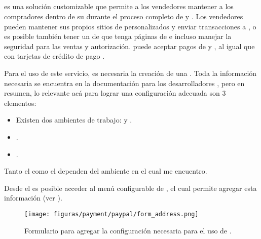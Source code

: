 		\subsection*{\PPPaymentProNAME}
			\PPPaymentProNAME es una solución customizable que permite a los vendedores mantener a los compradores dentro de su \websiteINT durante el proceso completo de \paymentsCOM y \checkoutCOM. Los vendedores pueden mantener sus propios sitios de \checkoutCOM personalizados y enviar transacciones a \paypalNAME, o es posible también tener un \hostCPT de \paypalNAME que tenga páginas de \checkoutCOM e incluso manejar la seguridad para las ventas y autorización. \PPPaymentProNAME puede aceptar pagos de \paypalNAME y  \paypalCreditNAME, al igual que con tarjetas de crédito de pago \cite{online_paypal_developer_acceptpayments}.

			Para el uso de este servicio, es necesaria la creación de una \paypalNAME \appINT. Toda la información necesaria se encuentra en la documentación para los desarrolladores \cite{online_paypal_developer_apps_credentials}, pero en resumen, lo relevante acá para lograr una configuración adecuada son 3 elementos:

				\begin{itemize}
					\item Existen dos ambientes de trabajo: \sandboxEnvPL y \liveEnvPL.
					\item \clientIDPayPal.
					\item \secretPayPal.
				\end{itemize}

			Tanto el \clientIDPayPal como el \secretPayPal dependen del ambiente en el cual me encuentro.

			Desde el \dashboardEF es posible acceder al menú configurable de \paypalNAME, el cual permite agregar esta información (ver ).

			\begin{figure}[H]
				\centering
				\texttt{[image: figuras/payment/paypal/form\_address.png]}
				\caption{Formulario para agregar la configuración necesaria para el uso de \paypalPayFlowNAME.}
				\label{figure:payment:paypal:payflow_pro:form}
			\end{figure}

